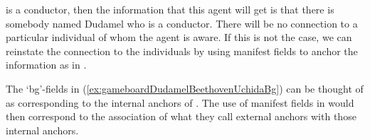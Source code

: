 is a conductor, then the information that this agent will get is that
there is somebody named Dudamel who is a conductor.  There will be no
connection to a particular individual of whom the agent is aware.  If
this is not the case, we can reinstate the connection to the
individuals by using manifest fields to anchor the information as in
\nexteg{}.
\begin{ex} 
\end{ex} 
The `bg'-fields in (\ref{ex:gameboardDudamelBeethovenUchidaBg}) can
be thought of as corresponding to the internal anchors of
\cite{Kamp1990,KampGenabithReyle2011}.  The use of manifest fields in
\preveg{} would then correspond to the association of what they call external anchors
with those internal anchors.

